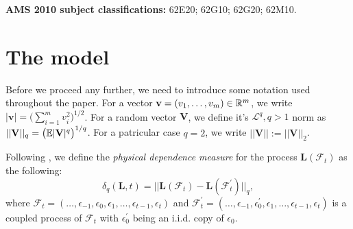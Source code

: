 \documentclass[a4paper,12pt]{article}
\begin{document}
\textbf{AMS 2010 subject classifications:} 62E20; 62G10; 62G20; 62M10. 

\vspace{-0.25cm}

\allowdisplaybreaks[1]


\section{The model}\label{sec-model}

Before we proceed any further, we need to introduce some notation used throughout the paper. For a vector $\mathbf{v} = (v_1, \ldots, v_m)\in\mathbb{R}^m$, we write $|\mathbf{v}| = \big(\sum_{i=1}^m v_i^2\big)^{1/2}$. For a random vector $\mathbf{V}$, we define it's $\mathcal{L}^q, q>1$ norm as $||\mathbf{V}||_q = \big(\mathbb{E} |\mathbf{V}|^q\big)^{1/q}$. For a patricular case $q = 2$, we write $||\mathbf{V}|| := ||\mathbf{V}||_2$.

Following \cite{Wu2005}, we define the \textit{physical dependence measure} for the process $\mathbf{L}(\mathcal{F}_t)$ as the following:
\[ \delta_q(\mathbf{L}, t) = || \mathbf{L}(\mathcal{F}_t) - \mathbf{L}(\mathcal{F}_t^\prime) ||_q,
\]
where $\mathcal{F}_t  = (\ldots, \epsilon_{-1}, \epsilon_0, \epsilon_1, \ldots, \epsilon_{t-1}, \epsilon_t)$ and $\mathcal{F}_t^\prime  = (\ldots, \epsilon_{-1}, \epsilon^\prime_0, \epsilon_1, \ldots, \epsilon_{t-1}, \epsilon_t)$ is a coupled process of $\mathcal{F}_t$ with $\epsilon_0^\prime$ being an i.i.d. copy of $\epsilon_0$.
\end{document}
